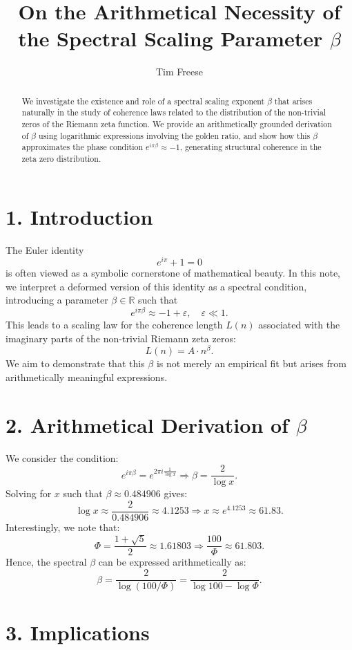 \documentclass[12pt]{article}
\title{On the Arithmetical Necessity of the Spectral Scaling Parameter \(\beta\)}
\author{Tim Freese}
\date{}
\begin{document}
\maketitle

\begin{abstract}
We investigate the existence and role of a spectral scaling exponent \(\beta\) that arises naturally in the study of coherence laws related to the distribution of the non-trivial zeros of the Riemann zeta function. We provide an arithmetically grounded derivation of \(\beta\) using logarithmic expressions involving the golden ratio, and show how this \(\beta\) approximates the phase condition \(e^{i\pi \beta} \approx -1\), generating structural coherence in the zeta zero distribution.
\end{abstract}

\section*{1. Introduction}

The Euler identity
\[
e^{i\pi} + 1 = 0
\]
is often viewed as a symbolic cornerstone of mathematical beauty. In this note, we interpret a deformed version of this identity as a spectral condition, introducing a parameter \(\beta \in \mathbb{R}\) such that
\[
e^{i\pi \beta} \approx -1 + \varepsilon, \quad \varepsilon \ll 1.
\]
This leads to a scaling law for the coherence length \(L(n)\) associated with the imaginary parts of the non-trivial Riemann zeta zeros:
\[
L(n) = A \cdot n^\beta.
\]
We aim to demonstrate that this \(\beta\) is not merely an empirical fit but arises from arithmetically meaningful expressions.

\section*{2. Arithmetical Derivation of \(\beta\)}

We consider the condition:
\[
e^{i\pi \beta} = e^{2\pi i \frac{1}{\log x}} \Rightarrow \beta = \frac{2}{\log x}.
\]
Solving for \(x\) such that \(\beta \approx 0.484906\) gives:
\[
\log x \approx \frac{2}{0.484906} \approx 4.1253 \Rightarrow x \approx e^{4.1253} \approx 61.83.
\]
Interestingly, we note that:
\[
\Phi = \frac{1 + \sqrt{5}}{2} \approx 1.61803 \Rightarrow \frac{100}{\Phi} \approx 61.803.
\]
Hence, the spectral \(\beta\) can be expressed arithmetically as:
\[
\beta = \frac{2}{\log(100 / \Phi)} = \frac{2}{\log 100 - \log \Phi}.
\]

\section*{3. Implications}
\end{document}
